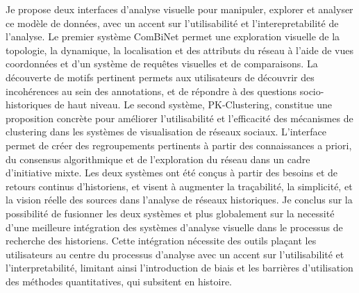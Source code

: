 {    Je propose deux interfaces d'analyse visuelle pour manipuler, explorer et analyser ce modèle de données, avec un accent sur l'utilisabilité et l'interepretabilité de l'analyse.
    Le premier système ComBiNet permet une exploration visuelle de la topologie, la dynamique, la localisation et des attributs du réseau à l'aide de vues coordonnées et d'un système de requêtes visuelles et de comparaisons.
    La découverte de motifs pertinent permets aux utilisateurs de découvrir des incohérences au sein des annotations, et de répondre à des questions socio-historiques de haut niveau.
    Le second système, PK-Clustering, constitue une proposition concrète pour améliorer l'utilisabilité et l'efficacité des mécanismes de clustering dans les systèmes de visualisation de réseaux sociaux.
    L'interface permet de créer des regroupements pertinents à partir des connaissances a priori, du consensus algorithmique et de l'exploration du réseau dans un cadre d'initiative mixte.
    Les deux systèmes ont été conçus à partir des besoins et de retours continus d'historiens, et visent à augmenter la traçabilité, la simplicité, et la vision réelle des sources dans l'analyse de réseaux historiques.
    Je conclus sur la possibilité de fusionner les deux systèmes et plus globalement sur la necessité d'une meilleure intégration des systèmes d'analyse visuelle dans le processus de recherche des historiens.
    Cette intégration nécessite des outils plaçant les utilisateurs au centre du processus d'analyse avec un accent sur l'utilisabilité et l'interpretabilité, limitant ainsi l'introduction de biais et les barrières d'utilisation des méthodes quantitatives, qui subsitent en histoire.
}



